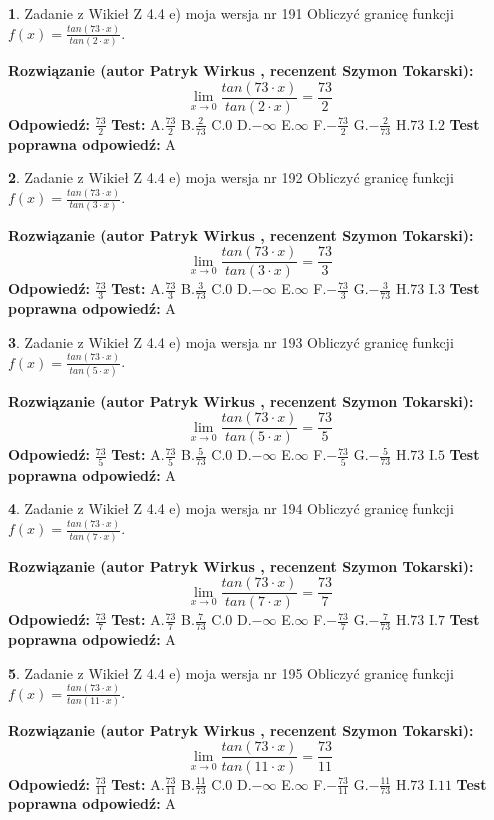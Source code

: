 \documentclass[12pt, a4paper]{article}
\theoremstyle{definition} %
\newtheorem{zad}{}
\newcommand{\zadStart}[1]{\begin{zad}#1\newline}
\newcommand{\zadStop}{\end{zad}}
\newcommand{\rozwStart}[2]{\noindent \textbf{Rozwiązanie (autor #1 , recenzent #2): }\newline}
\newcommand{\rozwStop}{\newline}
\newcommand{\odpStart}{\noindent \textbf{Odpowiedź:}\newline}
\newcommand{\odpStop}{\newline}
\newcommand{\testStart}{\noindent \textbf{Test:}\newline}
\newcommand{\testStop}{\newline}
\newcommand{\kluczStart}{\noindent \textbf{Test poprawna odpowiedź:}\newline}
\newcommand{\kluczStop}{\newline}
\begin{document}
\zadStart{Zadanie z Wikieł Z 4.4 e) moja wersja nr 191}
Obliczyć granicę funkcji $f(x)=\frac{tan(73\cdot x)}{tan(2\cdot x)}$.
\zadStop
\rozwStart{Patryk Wirkus}{Szymon Tokarski}
$$\lim\limits_{x\to 0}\frac{tan(73\cdot x)}{tan(2\cdot x)}=
\frac{73}{2}$$
\rozwStop
\odpStart
$\frac{73}{2}$
\odpStop
\testStart
A.$\frac{73}{2}$
B.$\frac{2}{73}$
C.$0$
D.$-\infty$
E.$\infty$
F.$-\frac{73}{2}$
G.$-\frac{2}{73}$
H.$73$
I.$2$
\testStop
\kluczStart
A
\kluczStop



\zadStart{Zadanie z Wikieł Z 4.4 e) moja wersja nr 192}
Obliczyć granicę funkcji $f(x)=\frac{tan(73\cdot x)}{tan(3\cdot x)}$.
\zadStop
\rozwStart{Patryk Wirkus}{Szymon Tokarski}
$$\lim\limits_{x\to 0}\frac{tan(73\cdot x)}{tan(3\cdot x)}=
\frac{73}{3}$$
\rozwStop
\odpStart
$\frac{73}{3}$
\odpStop
\testStart
A.$\frac{73}{3}$
B.$\frac{3}{73}$
C.$0$
D.$-\infty$
E.$\infty$
F.$-\frac{73}{3}$
G.$-\frac{3}{73}$
H.$73$
I.$3$
\testStop
\kluczStart
A
\kluczStop



\zadStart{Zadanie z Wikieł Z 4.4 e) moja wersja nr 193}
Obliczyć granicę funkcji $f(x)=\frac{tan(73\cdot x)}{tan(5\cdot x)}$.
\zadStop
\rozwStart{Patryk Wirkus}{Szymon Tokarski}
$$\lim\limits_{x\to 0}\frac{tan(73\cdot x)}{tan(5\cdot x)}=
\frac{73}{5}$$
\rozwStop
\odpStart
$\frac{73}{5}$
\odpStop
\testStart
A.$\frac{73}{5}$
B.$\frac{5}{73}$
C.$0$
D.$-\infty$
E.$\infty$
F.$-\frac{73}{5}$
G.$-\frac{5}{73}$
H.$73$
I.$5$
\testStop
\kluczStart
A
\kluczStop



\zadStart{Zadanie z Wikieł Z 4.4 e) moja wersja nr 194}
Obliczyć granicę funkcji $f(x)=\frac{tan(73\cdot x)}{tan(7\cdot x)}$.
\zadStop
\rozwStart{Patryk Wirkus}{Szymon Tokarski}
$$\lim\limits_{x\to 0}\frac{tan(73\cdot x)}{tan(7\cdot x)}=
\frac{73}{7}$$
\rozwStop
\odpStart
$\frac{73}{7}$
\odpStop
\testStart
A.$\frac{73}{7}$
B.$\frac{7}{73}$
C.$0$
D.$-\infty$
E.$\infty$
F.$-\frac{73}{7}$
G.$-\frac{7}{73}$
H.$73$
I.$7$
\testStop
\kluczStart
A
\kluczStop



\zadStart{Zadanie z Wikieł Z 4.4 e) moja wersja nr 195}
Obliczyć granicę funkcji $f(x)=\frac{tan(73\cdot x)}{tan(11\cdot x)}$.
\zadStop
\rozwStart{Patryk Wirkus}{Szymon Tokarski}
$$\lim\limits_{x\to 0}\frac{tan(73\cdot x)}{tan(11\cdot x)}=
\frac{73}{11}$$
\rozwStop
\odpStart
$\frac{73}{11}$
\odpStop
\testStart
A.$\frac{73}{11}$
B.$\frac{11}{73}$
C.$0$
D.$-\infty$
E.$\infty$
F.$-\frac{73}{11}$
G.$-\frac{11}{73}$
H.$73$
I.$11$
\testStop
\kluczStart
A
\kluczStop
\end{document}
